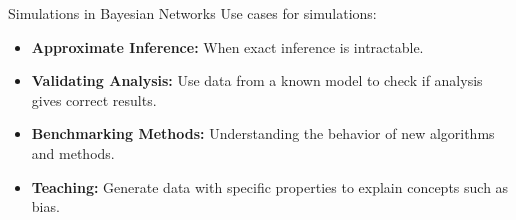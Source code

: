 \documentclass{beamer}
\begin{document}

\begin{frame}{Simulations in Bayesian Networks}
	Use cases for simulations:
	\vspace{2em}
	\begin{itemize}
		\setlength\itemsep{1em}
		\item \textbf{Approximate Inference:} When exact inference is intractable.
		\item \textbf{Validating Analysis:} Use data from a known model to check if analysis gives correct results.
		\item \textbf{Benchmarking Methods:} Understanding the behavior of new algorithms and methods.
		\item \textbf{Teaching:} Generate data with specific properties to explain concepts such as bias.
	\end{itemize}
\end{frame}
\end{document}
